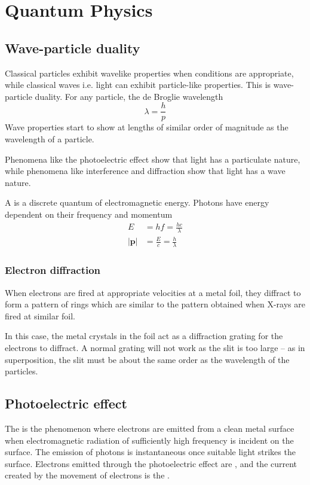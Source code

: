 \documentclass[Physics.tex]{subfiles}
\begin{document}
\chapter{Quantum Physics}
\section{Wave-particle duality}
Classical particles exhibit wavelike properties when conditions are appropriate, while classical waves i.e. light can exhibit particle-like properties. This is wave-particle duality. For any particle, the de Broglie wavelength \begin{equation}\lambda = \frac{h}{p}\end{equation} Wave properties start to show at lengths of similar order of magnitude as the wavelength of a particle.

Phenomena like the photoelectric effect show that light has a particulate nature, while phenomena like interference and diffraction show that light has a wave nature.

A  is a discrete quantum of electromagnetic energy. Photons have energy dependent on their frequency and momentum \begin{align}E &= hf = \frac{hc}{\lambda}\\\left|\mathbf{p}\right| &= \frac{E}{c} = \frac{h}{\lambda}\end{align}
\subsection{Electron diffraction}
When electrons are fired at appropriate velocities at a metal foil, they diffract to form a pattern of rings which are similar to the pattern obtained when X-rays are fired at similar foil.

In this case, the metal crystals in the foil act as a diffraction grating for the electrons to diffract. A normal grating will not work as the slit is too large -- as in superposition, the slit must be about the same order as the wavelength of the particles.
\section{Photoelectric effect}
The  is the phenomenon where electrons are emitted from a clean metal surface when electromagnetic radiation of sufficiently high frequency is incident on the surface. The emission of photons is instantaneous once suitable light strikes the surface. Electrons emitted through the photoelectric effect are , and the current created by the movement of electrons is the .
\end{document}
